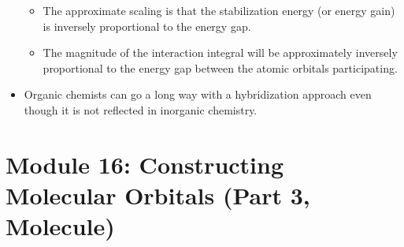 \documentclass[../notes.tex]{subfiles}
\begin{document}
\begin{itemize}
    \begin{itemize}
        \item The approximate scaling is that the stabilization energy (or energy gain) is inversely proportional to the energy gap.
        \item The magnitude of the interaction integral will be approximately inversely proportional to the energy gap between the atomic orbitals participating.
    \end{itemize}
    \item Organic chemists can go a long way with a hybridization approach even though it is not reflected in inorganic chemistry.
\end{itemize}



\section{Module 16: Constructing Molecular Orbitals (Part 3,  Molecule)}
\end{document}
